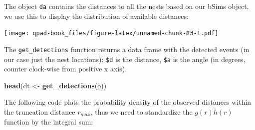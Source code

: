 \documentclass[12pt,]{book}
\newenvironment{Shaded}{\begin{snugshade}}{\end{snugshade}}
\newcommand{\DataTypeTok}[1]{\textcolor[rgb]{0.13,0.29,0.53}{#1}}
\newcommand{\DecValTok}[1]{\textcolor[rgb]{0.00,0.00,0.81}{#1}}
\newcommand{\KeywordTok}[1]{\textcolor[rgb]{0.13,0.29,0.53}{\textbf{#1}}}
\newcommand{\NormalTok}[1]{#1}
\newcommand{\OperatorTok}[1]{\textcolor[rgb]{0.81,0.36,0.00}{\textbf{#1}}}
\newcommand{\OtherTok}[1]{\textcolor[rgb]{0.56,0.35,0.01}{#1}}
\newcommand{\StringTok}[1]{\textcolor[rgb]{0.31,0.60,0.02}{#1}}
\begin{document}
The object \texttt{da} contains the distances to all the nests
based on our bSims object,
we use this to display the distribution of available distances:

\begin{Shaded}
\end{Shaded}

\texttt{[image: qpad-book\_files/figure-latex/unnamed-chunk-83-1.pdf]}

The \texttt{get\_detections} function returns a data frame with the
detected events (in our case just the nest locations):
\texttt{\$d} is the distance, \texttt{\$a} is the angle
(in degrees, counter clock-wise from positive x axis).

\begin{Shaded}
\begin{Highlighting}[]
\KeywordTok{head}\NormalTok{(dt <-}\StringTok{ }\KeywordTok{get_detections}\NormalTok{(o))}
\end{Highlighting}
\end{Shaded}

The following code plots the probability density of the
observed distances within the truncation distance \(r_{max}\),
thus we need to standardize the \(g(r) h(r)\) function
by the integral sum:
\end{document}
